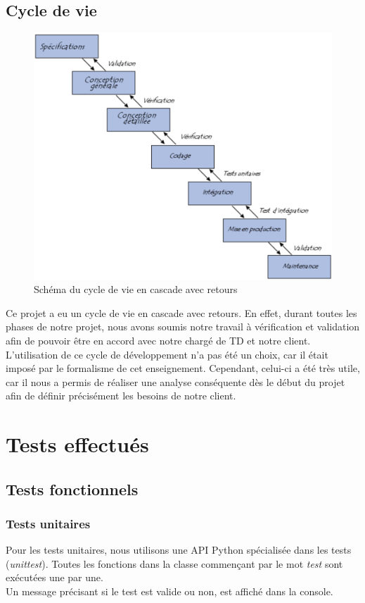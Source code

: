 \documentclass[17pts]{report}
\begin{document}
\section{Cycle de vie}
\label{sec:Cycle de vie}
\begin{figure}[H]
    \includegraphics[scale=0.7]{./illustrations/cycle_cascade.png}
    \centering
    \caption{Schéma du cycle de vie en cascade avec retours}
    \label{fig:CycleCascade}
\end{figure}

Ce projet a eu un cycle de vie en cascade avec retours. En effet, durant toutes
les phases de notre projet, nous avons soumis notre travail à vérification et
validation afin de pouvoir être en accord avec notre chargé de TD et notre
client. L'utilisation de ce cycle de développement n'a pas été un choix, car il
était imposé par le formalisme de cet enseignement. Cependant, celui-ci a été
très utile, car il nous a permis de réaliser une analyse conséquente dès le
début du projet afin de définir précisément les besoins de notre client.

\chapter{Tests effectués}\thispagestyle{IHA-fancy-style}
\label{cha:Tests}
\section{Tests fonctionnels}
\label{sec:Tests fonctionnels}
\subsection{Tests unitaires}
\label{sub:Tests unitaires}
Pour les tests unitaires, nous utilisons une API Python spécialisée dans les
tests (\textit{unittest}). Toutes les fonctions dans la classe commençant par
le mot \textit{test} sont exécutées une par une.\\ Un message précisant si le
test est valide ou non, est affiché dans la console.\\
\end{document}
